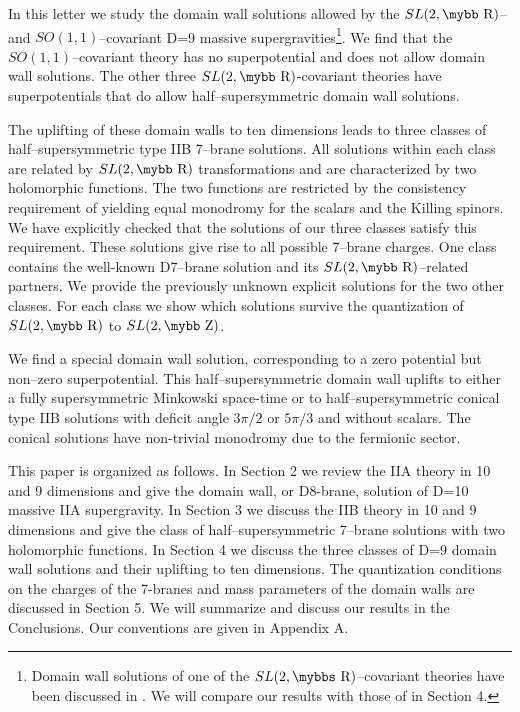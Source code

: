 \documentclass[12pt,a4paper]{article}
\def\bb#1{\hbox{\mybb#1}}
\def\bbs#1{\hbox{\mybbs#1}}
\begin{document}
In this letter we study the domain wall
solutions allowed by the $SL(2,\bb{R})$-- and $SO(1,1)$--covariant
D=9 massive supergravities\footnote{Domain wall solutions of one
of the $SL(2,\bbs{R})$--covariant theories have been discussed in
\cite{Cowdall:2000sq}. We will compare our results with those of
\cite{Cowdall:2000sq} in Section 4.}. We find that the
$SO(1,1)$--covariant theory has no superpotential and does not
allow domain wall solutions. The other three
$SL(2,\bb{R})$-covariant theories have superpotentials that do
allow half--supersymmetric domain wall solutions.


The uplifting of these domain walls to ten dimensions
leads to three classes of half--supersymmetric type IIB 7--brane solutions.
All solutions within each class are related by
$SL(2,\bb{R})$ transformations and are characterized by two
holomorphic functions. The two functions are restricted by the
consistency requirement of yielding equal monodromy for the scalars and the Killing
spinors. We have explicitly checked that the solutions of our three classes
satisfy this requirement. These solutions give rise to all possible
 7--brane
charges. One class contains the well-known D7--brane solution and its
$SL(2,\bb{R})$--related partners.  We provide the previously unknown explicit
solutions for the two other classes. For each class we show which
solutions survive the quantization of $SL(2,\bb{R})$ to
$SL(2,\bb{Z})$.


We  find a special domain wall solution, corresponding to a zero
potential but non--zero superpotential. This half--supersymmetric domain
wall uplifts to either a fully supersymmetric Minkowski space-time or to 
half--supersymmetric conical type IIB solutions with deficit
angle $3 \pi/2$ or $5 \pi/3$ and without scalars. The conical
solutions have non-trivial monodromy due to the fermionic sector.


This paper is organized as follows. In Section 2 we review the IIA
theory in 10 and 9 dimensions and give the domain wall, or
D8-brane, solution of D=10 massive IIA supergravity. In Section 3
we discuss the IIB theory in 10 and 9 dimensions and give the
class of half--supersymmetric 7--brane solutions with two
holomorphic functions. In Section 4 we discuss the three classes
of D=9 domain wall solutions and their uplifting to ten
dimensions. The quantization conditions on the charges of the 7-branes
and mass parameters of the domain walls are discussed in Section 5. We
will summarize and discuss our results in the Conclusions. Our
conventions are given in Appendix A.
\end{document}
